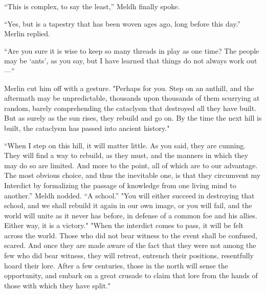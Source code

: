 \SomeVSpace
“This is{\el} complex, to say the least,” Meldh finally spoke.

“Yes, but is a tapestry that has been woven ages ago, long before this day.” Merlin replied.

“Are you sure it is wise to keep so many threads in play as one time? The people may be ‘ants’, as you say, but I have learned that things do not always work out\mbox{---}”

Merlin cut him off with a gesture. "Perhaps for you. Step on an anthill, and the aftermath may be unpredictable, thousands upon thousands of them scurrying at random, barely comprehending the cataclysm that destroyed all they have built. But as surely as the sun rises, they rebuild and go on. By the time the next hill is built, the cataclysm has passed into ancient history."

“When I step on this hill, it will matter little. As you said, they are cunning. They will find a way to rebuild, as they must, and the manners in which they may do so are limited. And more to the point, all of which are to our advantage. The most obvious choice, and thus the inevitable one, is that they circumvent my Interdict by formalizing the passage of knowledge from one living mind to another.”
\SmallVSpace
Meldh nodded. “A school.”
\SmallVSpace
"You will either succeed in destroying that school, and we shall rebuild it again in our own image, or you will fail, and the world will unite as it never has before, in defense of a common foe and his allies. Either way, it is a victory."
\SmallVSpace
"When the interdict comes to pass, it will be felt across the world. Those who did not bear witness to the event shall be confused, scared. And once they are made aware of the fact that they were not among the few who did bear witness, they will retreat, entrench their positions, resentfully hoard their lore. After a few centuries, those in the north will sense the opportunity, and embark on a great crusade to claim that lore from the hands of those with which they have split."

